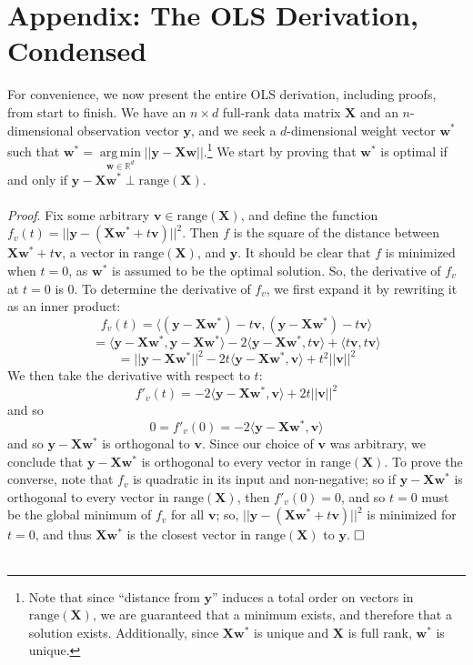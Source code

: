 \documentclass{article}
\DeclareMathOperator*{\argmin}{arg\,min}
\begin{document}
\section*{Appendix: The OLS Derivation, Condensed}
For convenience, we now present the entire OLS derivation, including proofs, from start to finish. We have an $n \times d$ full-rank data matrix $\mathbf{X}$ and an $n$-dimensional observation vector $\mathbf{y}$, and we seek a $d$-dimensional weight vector $\mathbf{w^*}$ such that $\mathbf{w^*} = \argmin\limits_{\mathbf{w} \in \mathbb{R}^d} ||\mathbf{y - Xw}||$.\footnote{Note that since ``distance from $\mathbf{y}$'' induces a total order on vectors in $\text{range}(\mathbf{X})$, we are guaranteed that a minimum exists, and therefore that a solution exists. Additionally, since $\mathbf{Xw^*}$ is unique and $\mathbf{X}$ is full rank, $\mathbf{w^*}$ is unique.} We start by proving that $\mathbf{w^*}$ is optimal if and only if $\mathbf{y - Xw^*} \perp \text{range}(\mathbf{X})$. \\\\
\textit{Proof}. Fix some arbitrary $\mathbf{v} \in \text{range}(\mathbf{X})$, and define the function $f_v(t) = ||\mathbf{y} - (\mathbf{Xw^*} + t\mathbf{v})||^2$. Then $f$ is the square of the distance between $\mathbf{Xw^*} + t\mathbf{v}$, a vector in $\text{range}(\mathbf{X})$, and $\mathbf{y}$. It should be clear that $f$ is minimized when $t = 0$, as $\mathbf{w^*}$ is assumed to be the optimal solution. So, the derivative of $f_v$ at $t = 0$ is 0. To determine the derivative of $f_v$, we first expand it by rewriting it as an inner product: $$f_v(t) = \langle (\mathbf{y} - \mathbf{Xw^*}) - t\mathbf{v}, (\mathbf{y} - \mathbf{Xw^*}) - t\mathbf{v} \rangle$$ $$= \langle \mathbf{y} - \mathbf{Xw^*}, \mathbf{y} - \mathbf{Xw^*} \rangle - 2\langle \mathbf{y} - \mathbf{Xw^*}, t\mathbf{v} \rangle + \langle t\mathbf{v}, t\mathbf{v}\rangle $$ $$= ||\mathbf{y} - \mathbf{Xw^*}||^2 - 2t\langle \mathbf{y} - \mathbf{Xw^*}, \mathbf{v}\rangle + t^2||\mathbf{v}||^2$$ We then take the derivative with respect to $t$: $$f'_v(t) = -2\langle \mathbf{y} - \mathbf{Xw^*}, \mathbf{v}\rangle + 2t||\mathbf{v}||^2$$ and so $$0 = f'_v(0) = -2\langle \mathbf{y} - \mathbf{Xw^*}, \mathbf{v} \rangle$$ and so $\mathbf{y - Xw^*}$ is orthogonal to $\mathbf{v}$. Since our choice of $\mathbf{v}$ was arbitrary, we conclude that $\mathbf{y - Xw^*}$ is orthogonal to every vector in $\text{range}(\mathbf{X})$. To prove the converse, note that $f_v$ is quadratic in its input and non-negative; so if $\mathbf{y - Xw^*}$ is orthogonal to every vector in $\text{range}(\mathbf{X})$, then $f'_v(0) = 0$, and so $t = 0$ must be the global minimum of $f_v$ for all $\mathbf{v}$; so, $||\mathbf{y} - (\mathbf{Xw^*} + t\mathbf{v})||^2$ is minimized for $t = 0$, and thus $\mathbf{Xw^*}$ is the closest vector in $\text{range}(\mathbf{X})$ to $\mathbf{y}$. $\hfill\square$ \\\\
\end{document}
